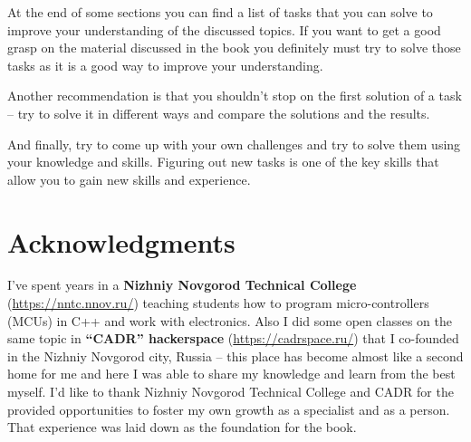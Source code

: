 \documentclass[../sparc.tex]{subfiles}
\begin{document}
At the end of some sections you can find a list of tasks that you can solve to
improve your understanding of the discussed topics.  If you want to get a good
grasp on the material discussed in the book you definitely must try to solve
those tasks as it is a good way to improve your understanding.

Another recommendation is that you shouldn't stop on the first solution of a
task -- try to solve it in different ways and compare the solutions and the
results.

And finally, try to come up with your own challenges and try to solve them using
your knowledge and skills.  Figuring out new tasks is one of the key skills that
allow you to gain new skills and experience.

\section*{Acknowledgments}

I've spent years in a \textbf{Nizhniy Novgorod Technical College}
(\url{https://nntc.nnov.ru/}) teaching students how to program micro-controllers
(MCUs) in C++ and work with electronics.  Also I did some open classes on the
same topic in \textbf{``CADR'' hackerspace} (\url{https://cadrspace.ru/}) that I
co-founded in the Nizhniy Novgorod city, Russia -- this place has become almost
like a second home for me and here I was able to share my knowledge and learn
from the best myself.  I'd like to thank Nizhniy Novgorod Technical College and
CADR for the provided opportunities to foster my own growth as a specialist and
as a person.  That experience was laid down as the foundation for the book.
\end{document}

